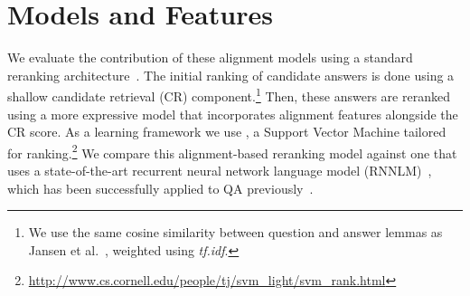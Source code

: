 \vspace{-1mm}
\section{Models and Features}
\label{sec:models}

We evaluate the contribution of these alignment models using a standard reranking architecture~\cite{jansen14}.
The initial ranking of candidate answers is done using a shallow candidate retrieval (CR) component.\footnote{We use the same cosine similarity between question and answer lemmas as Jansen et al.~, weighted using {\em tf.idf}.} %
Then, these answers are reranked using a more expressive model that incorporates alignment features alongside the CR score.  As a learning framework we use \svmr , a Support Vector Machine tailored for ranking.\footnote{ \url{http://www.cs.cornell.edu/people/tj/svm_light/svm_rank.html}}
We compare this alignment-based reranking model against one that uses a state-of-the-art recurrent neural network language model (RNNLM)~\cite{mikolov10,mikolov13}, which has been successfully applied to QA previously~\cite{yih13}.



